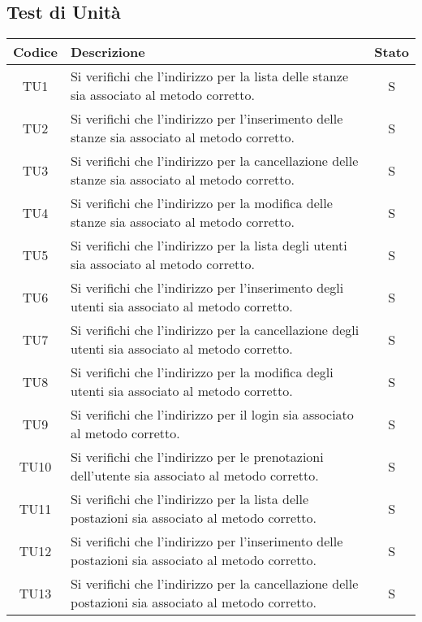 	\subsection{Test di Unità}
	\begin{center}
		\begin{longtable}{|c|p{10cm}|c|}
			\hline
			\rowcolor{lighter-grayer}
			\textbf{Codice} & \textbf{Descrizione} & \textbf{Stato}  \\ 
			
			\hline
			\endhead
			
			TU1 & Si verifichi che l'indirizzo per la lista delle stanze sia associato al metodo corretto. & S \\	
			\hline
			TU2 & Si verifichi che l'indirizzo per l'inserimento delle stanze sia associato al metodo corretto. & S \\	
			\hline
			TU3 & Si verifichi che l'indirizzo per la cancellazione delle stanze sia associato al metodo corretto. & S \\	
			\hline
			TU4 & Si verifichi che l'indirizzo per la modifica delle stanze sia associato al metodo corretto. & S \\	
			\hline
			TU5 & Si verifichi che l'indirizzo per la lista degli utenti sia associato al metodo corretto. & S \\	
			\hline
			TU6 & Si verifichi che l'indirizzo per l'inserimento degli utenti sia associato al metodo corretto. & S \\	
			\hline
			TU7 & Si verifichi che l'indirizzo per la cancellazione degli utenti sia associato al metodo corretto. & S \\	
			\hline
			TU8 & Si verifichi che l'indirizzo per la modifica degli utenti sia associato al metodo corretto. & S \\	
			\hline
			TU9 & Si verifichi che l'indirizzo per il login sia associato al metodo corretto. & S \\	
			\hline
			TU10 & Si verifichi che l'indirizzo per le prenotazioni dell'utente sia associato al metodo corretto. & S \\	
			\hline
			TU11 & Si verifichi che l'indirizzo per la lista delle postazioni sia associato al metodo corretto. & S \\	
			\hline
			TU12 & Si verifichi che l'indirizzo per l'inserimento delle postazioni sia associato al metodo corretto. & S \\	
			\hline
			TU13 & Si verifichi che l'indirizzo per la cancellazione delle postazioni sia associato al metodo corretto. & S \\	

\end{longtable}
\end{center}

